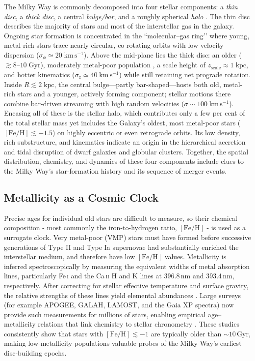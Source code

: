 \documentclass[a4paper,12pt]{article}
\begin{document}
The Milky Way is commonly decomposed into four stellar components: a \emph{thin disc}, 
a \emph{thick disc}, a central \emph{bulge/bar}, and a roughly spherical \emph{halo} 
\citep{BlandHawthorn2016,Helmi2020}.  
The thin disc describes the majority of stars and most of the interstellar gas 
in the galaxy.  Ongoing star formation is concentrated in the “molecular–gas ring’’ where young, 
metal-rich stars trace nearly circular, co-rotating 
orbits with low velocity dispersion ($\sigma_\phi \simeq 20\;\mathrm{km\,s^{-1}}$).  
Above the mid-plane lies the thick disc: an older ($\gtrsim8$–$10\;\mathrm{Gyr}$), 
moderately metal-poor population , a scale 
height of $z_{\mathrm{scale}}\approx1\;\mathrm{kpc}$, and hotter kinematics 
($\sigma_z \simeq 40\;\mathrm{km\,s^{-1}}$) while still retaining net prograde rotation.  
Inside $R\lesssim2\;\mathrm{kpc}$, the central bulge—partly bar-shaped—hosts both 
old, metal-rich stars and a younger, actively forming component; stellar motions 
there combine bar-driven streaming with high random velocities 
($\sigma\sim100\;\mathrm{km\,s^{-1}}$).  
Encasing all of these is the stellar halo, which contributes only a few per cent 
of the total stellar mass yet includes the Galaxy’s oldest, most metal-poor stars 
($[\mathrm{Fe/H}]\lesssim-1.5$) on highly eccentric or even retrograde orbits.  
Its low density, rich substructure, and kinematics indicate an origin in the
 hierarchical accretion and tidal disruption of dwarf galaxies and globular clusters.  
Together, the spatial distribution, chemistry, and dynamics of these four components 
include clues to the Milky Way’s star-formation history and its sequence of merger events.


\subsection{Metallicity as a Cosmic Clock}

Precise ages for individual old stars are difficult to measure, so their chemical 
composition - most commonly the iron-to-hydrogen ratio, $[\mathrm{Fe/H}]$ - is 
used as a surrogate clock.  
Very metal-poor (VMP) stars must have formed before successive generations of Type II 
and Type Ia supernovae had substantially enriched the interstellar medium, and 
therefore have low $[\mathrm{Fe/H}]$ values.  
Metallicity is inferred spectroscopically by measuring the equivalent widths of 
metal absorption lines, particularly Fe\,\textsc{i} and the Ca\,\textsc{ii} H and 
K lines at 396.8\,nm and 393.4\,nm, respectively. After correcting for stellar 
effective temperature and surface gravity, the relative strengths of these lines 
yield elemental abundances \citep{Gray_2005}.
Large surveys (for example APOGEE, GALAH, LAMOST, and the Gaia XP spectra) now 
provide such measurements for millions of stars, enabling empirical age–metallicity 
relations that link chemistry to stellar chronometry 
\citep[e.g.][]{Nordstrom2004,Haywood2013,leung2019deep,Anders2023}.  
These studies consistently show that stars with $[\mathrm{Fe/H}]\lesssim -1$ are 
typically older than $\sim10$\,Gyr, making low-metallicity populations valuable 
probes of the Milky Way’s earliest disc-building epochs.
\end{document}
